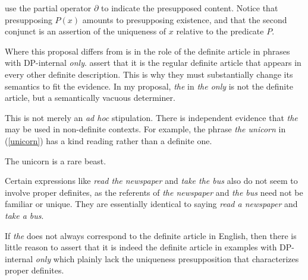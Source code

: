 \citeauthor{cb2015} use the partial operator $\partial$ to indicate the presupposed content. Notice that presupposing $P(x)$ amounts to presupposing existence, and that the second conjunct is an assertion of the uniqueness of $x$ relative to the predicate $P$.

Where this proposal differs from  is in the role of the definite article in phrases with DP-internal \textit{only}. \citeauthor{cb2015} assert that it is the regular definite article that appears in every other definite description. This is why they must substantially change its semantics to fit the evidence. In my proposal, \textit{the} in \textit{the only} is not the definite article, but a semantically vacuous determiner.

This is not merely an \textit{ad hoc} stipulation. There is independent evidence that \textit{the} may be used in non-definite contexts. For example, the phrase \textit{the unicorn} in (\ref{unicorn}) has a kind reading rather than a definite one.

\begin{exe}
	\ex \label{unicorn} The unicorn is a rare beast.
\end{exe}

Certain expressions like \textit{read the newspaper} and \textit{take the bus} also do not seem to involve proper definites, as the referents of \textit{the newspaper} and \textit{the bus} need not be familiar or unique. They are essentially identical to saying \textit{read a newspaper} and \textit{take a bus}.

If \textit{the} does not always correspond to the definite article in English, then there is little reason to assert that it is indeed the definite article in examples with DP-internal \textit{only} which plainly lack the uniqueness presupposition that characterizes proper definites.